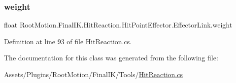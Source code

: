 \subsubsection{\texorpdfstring{weight}{weight}}
{\footnotesize\ttfamily float Root\+Motion.\+Final\+I\+K.\+Hit\+Reaction.\+Hit\+Point\+Effector.\+Effector\+Link.\+weight}



Definition at line 93 of file Hit\+Reaction.\+cs.



The documentation for this class was generated from the following file\+:\begin{DoxyCompactItemize}
\item 
Assets/\+Plugins/\+Root\+Motion/\+Final\+I\+K/\+Tools/\mbox{\hyperlink{_hit_reaction_8cs}{Hit\+Reaction.\+cs}}\end{DoxyCompactItemize}
